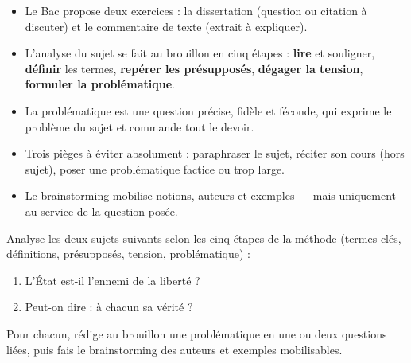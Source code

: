 \documentclass[11pt]{article}
\newcommand{\cle}[1]{{\popxbold\color{popdark}#1}}
\begin{document}
\begin{aretenir}
\begin{itemize}
\item Le Bac propose deux exercices : la \cle{dissertation} (question ou citation à discuter) et le \cle{commentaire de texte} (extrait à expliquer).
\item L'analyse du sujet se fait au brouillon en cinq étapes : \textbf{lire} et souligner, \textbf{définir} les termes, \textbf{repérer les présupposés}, \textbf{dégager la tension}, \textbf{formuler la problématique}.
\item La problématique est une question précise, fidèle et féconde, qui exprime le problème du sujet et commande tout le devoir.
\item Trois pièges à éviter absolument : paraphraser le sujet, réciter son cours (hors sujet), poser une problématique factice ou trop large.
\item Le brainstorming mobilise notions, auteurs et exemples — mais uniquement au service de la question posée.
\end{itemize}
\end{aretenir}

\begin{exercice}
Analyse les deux sujets suivants selon les cinq étapes de la méthode (termes clés, définitions, présupposés, tension, problématique) :
\begin{enumerate}
\item \guillemotleft L'État est-il l'ennemi de la liberté ? \guillemotright
\item \guillemotleft Peut-on dire : à chacun sa vérité ? \guillemotright
\end{enumerate}
Pour chacun, rédige au brouillon une problématique en une ou deux questions liées, puis fais le brainstorming des auteurs et exemples mobilisables.
\end{exercice}
\end{document}
